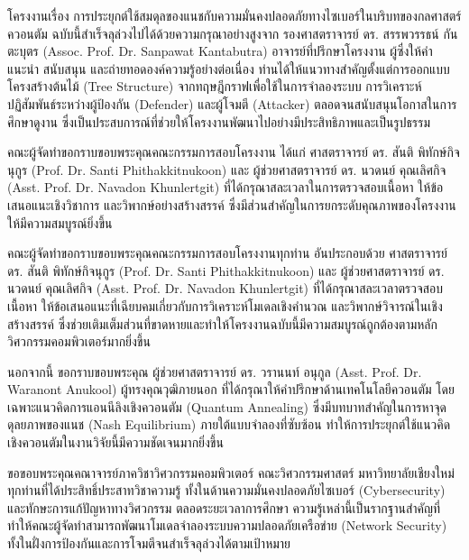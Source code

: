\begin{acknowledgments}
\hspace{1.5em}โครงงานเรื่อง การประยุกต์ใช้สมดุลของแนชกับความมั่นคงปลอดภัยทางไซเบอร์ในบริบทของกลศาสตร์ควอนตัม ฉบับนี้สำเร็จลุล่วงไปได้ด้วยความกรุณาอย่างสูงจาก รองศาสตราจารย์ ดร. สรรพวรรธน์ กันตะบุตร (Assoc. Prof. Dr. Sanpawat Kantabutra) อาจารย์ที่ปรึกษาโครงงาน ผู้ซึ่งให้คำแนะนำ สนับสนุน และถ่ายทอดองค์ความรู้อย่างต่อเนื่อง ท่านได้ให้แนวทางสำคัญตั้งแต่การออกแบบโครงสร้างต้นไม้ (Tree Structure) จากทฤษฎีกราฟเพื่อใช้ในการจำลองระบบ การวิเคราะห์ปฏิสัมพันธ์ระหว่างผู้ป้องกัน (Defender) และผู้โจมตี (Attacker) ตลอดจนสนับสนุนโอกาสในการศึกษาดูงาน ซึ่งเป็นประสบการณ์ที่ช่วยให้โครงงานพัฒนาไปอย่างมีประสิทธิภาพและเป็นรูปธรรม

คณะผู้จัดทำขอกราบขอบพระคุณคณะกรรมการสอบโครงงาน ได้แก่ ศาสตราจารย์ ดร. สันติ พิทักษ์กิจนุกูร (Prof. Dr. Santi Phithakkitnukoon) และ ผู้ช่วยศาสตราจารย์ ดร. นวดนย์ คุณเลิศกิจ (Asst. Prof. Dr. Navadon Khunlertgit) ที่ได้กรุณาสละเวลาในการตรวจสอบเนื้อหา ให้ข้อเสนอแนะเชิงวิชาการ และวิพากษ์อย่างสร้างสรรค์ ซึ่งมีส่วนสำคัญในการยกระดับคุณภาพของโครงงานให้มีความสมบูรณ์ยิ่งขึ้น

คณะผู้จัดทำขอกราบขอบพระคุณคณะกรรมการสอบโครงงานทุกท่าน อันประกอบด้วย ศาสตราจารย์ ดร. สันติ พิทักษ์กิจนุกูร (Prof. Dr. Santi Phithakkitnukoon) และ ผู้ช่วยศาสตราจารย์ ดร. นวดนย์ คุณเลิศกิจ (Asst. Prof. Dr. Navadon Khunlertgit) ที่ได้กรุณาสละเวลาตรวจสอบเนื้อหา ให้ข้อเสนอแนะที่เฉียบคมเกี่ยวกับการวิเคราะห์โมเดลเชิงคำนวณ และวิพากษ์วิจารณ์ในเชิงสร้างสรรค์ ซึ่งช่วยเติมเต็มส่วนที่ขาดหายและทำให้โครงงานฉบับนี้มีความสมบูรณ์ถูกต้องตามหลักวิศวกรรมคอมพิวเตอร์มากยิ่งขึ้น

นอกจากนี้ ขอกราบขอบพระคุณ ผู้ช่วยศาสตราจารย์ ดร. วรานนท์ อนุกูล (Asst. Prof. Dr. Waranont Anukool) ผู้ทรงคุณวุฒิภายนอก ที่ได้กรุณาให้คำปรึกษาด้านเทคโนโลยีควอนตัม โดยเฉพาะแนวคิดการแอนนีลิงเชิงควอนตัม (Quantum Annealing) ซึ่งมีบทบาทสำคัญในการหาจุดดุลยภาพของแนช (Nash Equilibrium) ภายใต้แบบจำลองที่ซับซ้อน ทำให้การประยุกต์ใช้แนวคิดเชิงควอนตัมในงานวิจัยนี้มีความชัดเจนมากยิ่งขึ้น

ขอขอบพระคุณคณาจารย์ภาควิชาวิศวกรรมคอมพิวเตอร์ คณะวิศวกรรมศาสตร์ มหาวิทยาลัยเชียงใหม่ ทุกท่านที่ได้ประสิทธิ์ประสาทวิชาความรู้ ทั้งในด้านความมั่นคงปลอดภัยไซเบอร์ (Cybersecurity) และทักษะการแก้ปัญหาทางวิศวกรรม ตลอดระยะเวลาการศึกษา ความรู้เหล่านี้เป็นรากฐานสำคัญที่ทำให้คณะผู้จัดทำสามารถพัฒนาโมเดลจำลองระบบความปลอดภัยเครือข่าย (Network Security) ทั้งในฝั่งการป้องกันและการโจมตีจนสำเร็จลุล่วงได้ตามเป้าหมาย


\end{acknowledgments}
